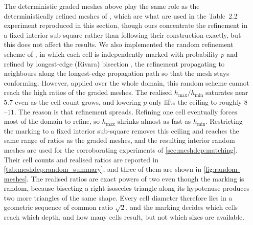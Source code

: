 \documentclass[a4paper,11pt]{article}
\theoremstyle{spacedplain} \newtheorem{theorem}[counter]{Theorem} \newtheorem{lemma}[counter]{Lemma} \newtheorem{prop}[counter]{Proposition} \newtheorem{cor}[counter]{Corollary}
\theoremstyle{spaceddefinition} \newtheorem{defn}[counter]{Definition} \newtheorem{example}[counter]{Example} \newtheorem{remark}[counter]{Remark}
\begin{document}
The deterministic graded meshes above play the same role as the deterministically refined meshes of \citet[Sect.~2.3.1]{shfp2017}, which are what are used in the Table~2.2 experiment reproduced in this section, though ours concentrate the refinement in a fixed interior sub-square rather than following their construction exactly, but this does not affect the results. We also implemented the random refinement scheme of \citet[Sect.~2.3.2.1]{shfp2017}, in which each cell is independently marked with probability $p$ and refined by longest-edge (Rivara) bisection \citep{rivara1984}, the refinement propagating to neighbours along the longest-edge propagation path so that the mesh stays conforming. However, applied over the whole domain, this random scheme cannot reach the high ratios of the graded meshes. The realised $h_{\max}/h_{\min}$ saturates near $5.7$ even as the cell count grows, and lowering $p$ only lifts the ceiling to roughly $8$--$11$. The reason is that refinement spreads. Refining one cell eventually forces most of the domain to refine, so $h_{\max}$ shrinks almost as fast as $h_{\min}$. Restricting the marking to a fixed interior sub-square removes this ceiling and reaches the same range of ratios as the graded meshes, and the resulting interior random meshes are used for the corroborating experiments of \cref{sec:meshdep:matching}. Their cell counts and realised ratios are reported in \cref{tab:meshdep:random_summary}, and three of them are shown in \cref{fig:random-meshes}. The realised ratios are exact powers of two even though the marking is random, because bisecting a right isosceles triangle along its hypotenuse produces two more triangles of the same shape. Every cell diameter therefore lies in a geometric sequence of common ratio $\sqrt{2}$, and the marking decides which cells reach which depth, and how many cells result, but not which sizes are available.
\end{document}
